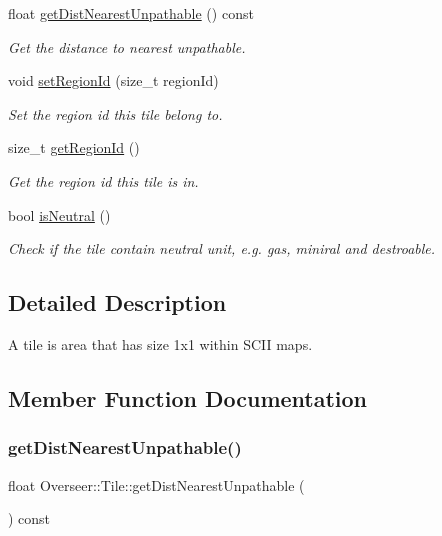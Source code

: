 \begin{DoxyCompactItemize}
float \hyperlink{classOverseer_1_1Tile_a120fd6da5041e8c60bb8d92caa111576}{get\+Dist\+Nearest\+Unpathable} () const
\begin{DoxyCompactList}\small\item\em Get the distance to nearest unpathable. \end{DoxyCompactList}\item 
void \hyperlink{classOverseer_1_1Tile_a8f0f9bc7bd55533a4df7cf2cafc08eaa}{set\+Region\+Id} (size\+\_\+t region\+Id)
\begin{DoxyCompactList}\small\item\em Set the region id this tile belong to. \end{DoxyCompactList}\item 
size\+\_\+t \hyperlink{classOverseer_1_1Tile_aa1fa9037029a36f50b3c13130813e825}{get\+Region\+Id} ()
\begin{DoxyCompactList}\small\item\em Get the region id this tile is in. \end{DoxyCompactList}\item 
\mbox{\label{classOverseer_1_1Tile_ae2e7f85589e4963a0474b038cff3daa0}} 
bool \hyperlink{classOverseer_1_1Tile_ae2e7f85589e4963a0474b038cff3daa0}{is\+Neutral} ()
\begin{DoxyCompactList}\small\item\em Check if the tile contain neutral unit, e.\+g. gas, miniral and destroable. \end{DoxyCompactList}\end{DoxyCompactItemize}


\subsection{Detailed Description}
A tile is area that has size 1x1 within S\+C\+II maps. 

\subsection{Member Function Documentation}
\mbox{\label{classOverseer_1_1Tile_a120fd6da5041e8c60bb8d92caa111576}} 
\subsubsection{\texorpdfstring{get\+Dist\+Nearest\+Unpathable()}{getDistNearestUnpathable()}}
{\footnotesize\ttfamily float Overseer\+::\+Tile\+::get\+Dist\+Nearest\+Unpathable (\begin{DoxyParamCaption}{ }\end{DoxyParamCaption}) const}



